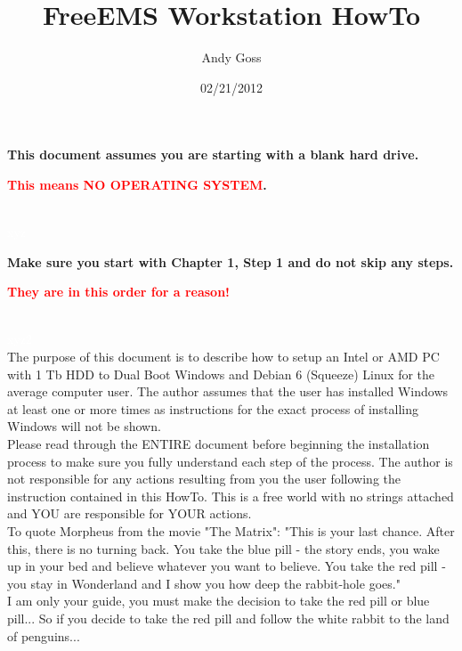 \documentclass[12pt,notitlepage,onecolumn,oneside,openany]{memoir}
\title{\textsf{FreeEMS Workstation HowTo}}
\author{\textsf{Andy Goss}}
\date{\textsf{02/21/2012}}
\begin{document}
\maketitle

\centerline{\textbf{\textsf{This document assumes you are starting with a blank hard drive.}}} 
\centerline{\textbf{\textsf{\textcolor{red}{This means NO OPERATING SYSTEM}.}}}
\\
\textcolor{white}{\textsf{xyz}}
\\
\centerline{\textbf{\textsf{Make sure you start with Chapter 1, Step 1 and do not skip any steps.}}}
\centerline{\textbf{\textsf{\textcolor{red}{They are in this order for a reason!}}}}
\\
\textcolor{white}{\textsf{xyz2}}
\\
\textsf{The purpose of this document is to describe how to setup an Intel or AMD PC with 1 Tb HDD to Dual Boot Windows and Debian 6 (Squeeze) Linux for the average computer user.  The author assumes that the user has installed Windows at least one or more times as instructions for the exact process of installing Windows will not be shown.} \newline
\\
\textsf{Please read through the ENTIRE document before beginning the installation process to make sure you fully understand each step of the process.  The author is not responsible for any actions resulting from you the user following the instruction contained in this HowTo. This is a free world with no strings attached and YOU are responsible for YOUR actions.} \newline
\\
\textsf{To quote Morpheus from the movie "The Matrix": "This is your last chance. After this, there is no turning back. You take the blue pill - the story ends, you wake up in your bed and believe whatever you want to believe. You take the red pill - you stay in Wonderland and I show you how deep the rabbit-hole goes."} \newline
\\
\textsf{I am only your guide, you must make the decision to take the red pill or blue pill...} \newline
\textsf{So if you decide to take the red pill and follow the white rabbit to the land of penguins...} \newline

\pagebreak 

\tableofcontents

\newpage 
\end{document}
